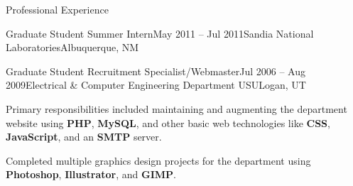 \begin{rSection}{Professional Experience}
\begin{rExperienceBullets}{Graduate Student Summer Intern}{May 2011 -- Jul 2011}{Sandia National Laboratories}{Albuquerque, NM}
\end{rExperienceBullets}


\begin{rExperienceBullets}{Graduate Student Recruitment Specialist/Webmaster}{Jul 2006 -- Aug 2009}{Electrical \& Computer Engineering Department USU}{Logan, UT}

  \item Primary responsibilities included maintaining and augmenting the department website using \textbf{PHP}, \textbf{MySQL}, and other basic web technologies like \textbf{CSS}, \textbf{JavaScript}, and an \textbf{SMTP} server.

  \item Completed multiple graphics design projects for the department using \textbf{Photoshop}, \textbf{Illustrator}, and \textbf{GIMP}.

%
%
%
%

\end{rExperienceBullets}

\end{rSection}

